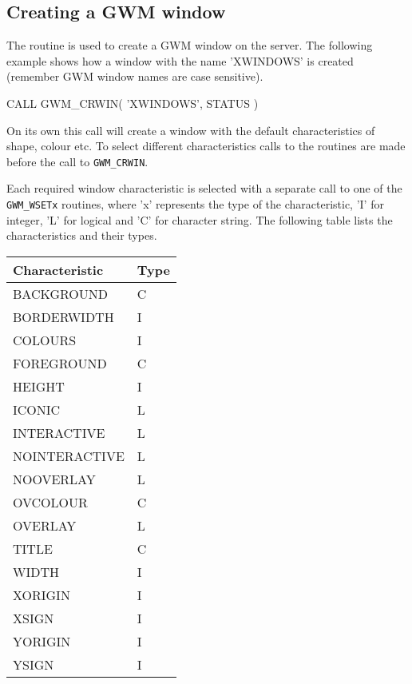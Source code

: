 \documentclass[twoside,11pt,nolof]{starlink}
\begin{document}
\subsection{Creating a GWM window}
The routine \texttt{}
is used to create a GWM window on the
server. The following example shows how a window with the name 'XWINDOWS'
is created (remember GWM window names are case sensitive).
\begin{terminalv}
CALL GWM_CRWIN( 'XWINDOWS', STATUS )
\end{terminalv}
On its own this call will create a window with the default characteristics
of shape, colour etc. To select different characteristics calls to the
routines \texttt{} are made before
the call to \texttt{GWM\_CRWIN}.

Each required window characteristic is selected with a separate call to
one of the \texttt{GWM\_WSETx} routines, where 'x' represents the type of
the characteristic, 'I' for integer, 'L' for logical and 'C' for character
string. The following table lists the characteristics and their types.

\begin{center}
\begin{tabular}{|l|l|}   \hline
Characteristic & Type \\ \hline
BACKGROUND     & C    \\
BORDERWIDTH    & I    \\
COLOURS        & I    \\
FOREGROUND     & C    \\
HEIGHT         & I    \\
ICONIC         & L    \\
INTERACTIVE    & L    \\
NOINTERACTIVE  & L    \\
NOOVERLAY      & L    \\
OVCOLOUR       & C    \\
OVERLAY        & L    \\
TITLE          & C    \\
WIDTH          & I    \\
XORIGIN        & I    \\
XSIGN          & I    \\
YORIGIN        & I    \\
YSIGN          & I    \\ \hline
\end{tabular}
\end{center}
\end{document}
